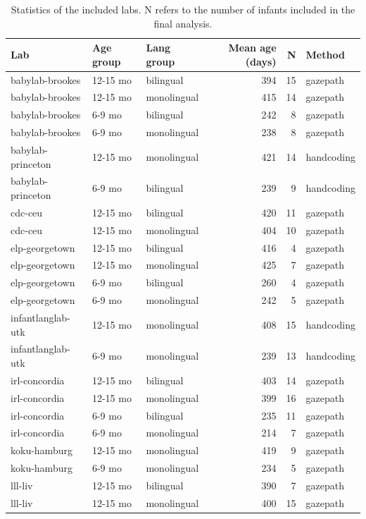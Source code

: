 \documentclass[,man,floatsintext]{apa6}
\begin{document}
\begin{longtable}[t]{lllrrl}
\caption{\label{tab:unnamed-chunk-4}Statistics of the included labs. N refers to the number of infants included in the final analysis.}\\
\toprule
Lab & Age group & Lang group & Mean age (days) & N & Method\\
\midrule
babylab-brookes & 12-15 mo & bilingual & 394 & 15 & gazepath\\
babylab-brookes & 12-15 mo & monolingual & 415 & 14 & gazepath\\
babylab-brookes & 6-9 mo & bilingual & 242 & 8 & gazepath\\
babylab-brookes & 6-9 mo & monolingual & 238 & 8 & gazepath\\
babylab-princeton & 12-15 mo & monolingual & 421 & 14 & handcoding\\
\addlinespace
babylab-princeton & 6-9 mo & bilingual & 239 & 9 & handcoding\\
cdc-ceu & 12-15 mo & bilingual & 420 & 11 & gazepath\\
cdc-ceu & 12-15 mo & monolingual & 404 & 10 & gazepath\\
elp-georgetown & 12-15 mo & bilingual & 416 & 4 & gazepath\\
elp-georgetown & 12-15 mo & monolingual & 425 & 7 & gazepath\\
\addlinespace
elp-georgetown & 6-9 mo & bilingual & 260 & 4 & gazepath\\
elp-georgetown & 6-9 mo & monolingual & 242 & 5 & gazepath\\
infantlanglab-utk & 12-15 mo & monolingual & 408 & 15 & handcoding\\
infantlanglab-utk & 6-9 mo & monolingual & 239 & 13 & handcoding\\
irl-concordia & 12-15 mo & bilingual & 403 & 14 & gazepath\\
\addlinespace
irl-concordia & 12-15 mo & monolingual & 399 & 16 & gazepath\\
irl-concordia & 6-9 mo & bilingual & 235 & 11 & gazepath\\
irl-concordia & 6-9 mo & monolingual & 214 & 7 & gazepath\\
koku-hamburg & 12-15 mo & monolingual & 419 & 9 & gazepath\\
koku-hamburg & 6-9 mo & monolingual & 234 & 5 & gazepath\\
\addlinespace
lll-liv & 12-15 mo & bilingual & 390 & 7 & gazepath\\
lll-liv & 12-15 mo & monolingual & 400 & 15 & gazepath\\

\end{longtable}
\end{document}
